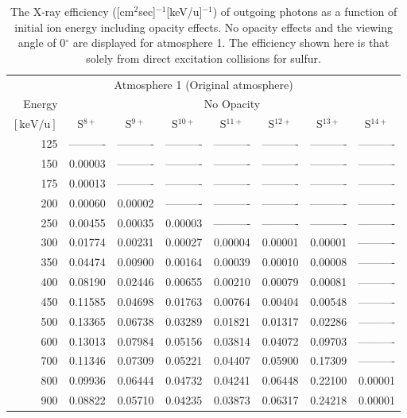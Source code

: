 \begin{table}[ht]
    \centering
    \caption{The X-ray efficiency ([cm$^2$sec]$^{-1}$[keV/u]$^{-1}$) of outgoing photons as a function of initial ion energy including opacity effects. No opacity effects and the viewing angle of 0$^\circ$ are displayed for atmosphere 1. The efficiency shown here is that solely from direct excitation collisions for sulfur.}
    \begin{tabular}{r|c|c|c|c|c|c|c}
    \multicolumn{8}{c}{Atmosphere 1 (Original atmosphere)} \\ \cline{2-8}
    Energy & \multicolumn{7}{c}{No Opacity} \\ \cline{2-8}
    $\mathrm{[keV/u]}$ & S$^{8+}$ & S$^{9+}$ & S$^{10+}$ & S$^{11+}$ & S$^{12+}$ & S$^{13+}$ & S$^{14+}$ \\ \cline{1-8}
      125 & ---------- & ---------- & ---------- & ---------- & ---------- & ---------- & ---------- \\ 
      150 & 0.00003 & ---------- & ---------- & ---------- & ---------- & ---------- & ---------- \\
      175 & 0.00013 & ---------- & ---------- & ---------- & ---------- & ---------- & ---------- \\
      200 & 0.00060 & 0.00002 & ---------- & ---------- & ---------- & ---------- & ---------- \\
      250 & 0.00455 & 0.00035 & 0.00003 & ---------- & ---------- & ---------- & ---------- \\
      300 & 0.01774 & 0.00231 & 0.00027 & 0.00004 & 0.00001 & 0.00001 & ---------- \\
      350 & 0.04474 & 0.00900 & 0.00164 & 0.00039 & 0.00010 & 0.00008 & ---------- \\
      400 & 0.08190 & 0.02446 & 0.00655 & 0.00210 & 0.00079 & 0.00081 & ---------- \\
      450 & 0.11585 & 0.04698 & 0.01763 & 0.00764 & 0.00404 & 0.00548 & ---------- \\
      500 & 0.13365 & 0.06738 & 0.03289 & 0.01821 & 0.01317 & 0.02286 & ---------- \\
      600 & 0.13013 & 0.07984 & 0.05156 & 0.03814 & 0.04072 & 0.09703 & ---------- \\
      700 & 0.11346 & 0.07309 & 0.05221 & 0.04407 & 0.05900 & 0.17309 & ---------- \\
      800 & 0.09936 & 0.06444 & 0.04732 & 0.04241 & 0.06448 & 0.22100 & 0.00001 \\
      900 & 0.08822 & 0.05710 & 0.04235 & 0.03873 & 0.06317 & 0.24218 & 0.00001 \\

\end{tabular}
\end{table}
